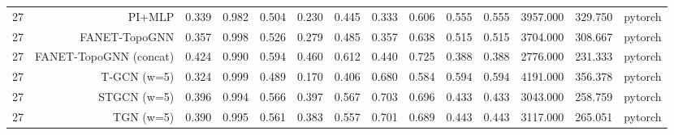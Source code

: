 \begin{tabular}{lrrrrrrrrrrrrr}
27 & PI+MLP & 0.339 & 0.982 & 0.504 & 0.230 & 0.445 & 0.333 & 0.606 & 0.555 & 0.555 & 3957.000 & 329.750 & pytorch \\
27 & FANET-TopoGNN & 0.357 & 0.998 & 0.526 & 0.279 & 0.485 & 0.357 & 0.638 & 0.515 & 0.515 & 3704.000 & 308.667 & pytorch \\
27 & FANET-TopoGNN (concat) & 0.424 & 0.990 & 0.594 & 0.460 & 0.612 & 0.440 & 0.725 & 0.388 & 0.388 & 2776.000 & 231.333 & pytorch \\
27 & T-GCN (w=5) & 0.324 & 0.999 & 0.489 & 0.170 & 0.406 & 0.680 & 0.584 & 0.594 & 0.594 & 4191.000 & 356.378 & pytorch \\
27 & STGCN (w=5) & 0.396 & 0.994 & 0.566 & 0.397 & 0.567 & 0.703 & 0.696 & 0.433 & 0.433 & 3043.000 & 258.759 & pytorch \\
27 & TGN (w=5) & 0.390 & 0.995 & 0.561 & 0.383 & 0.557 & 0.701 & 0.689 & 0.443 & 0.443 & 3117.000 & 265.051 & pytorch \\
\bottomrule
\end{tabular}